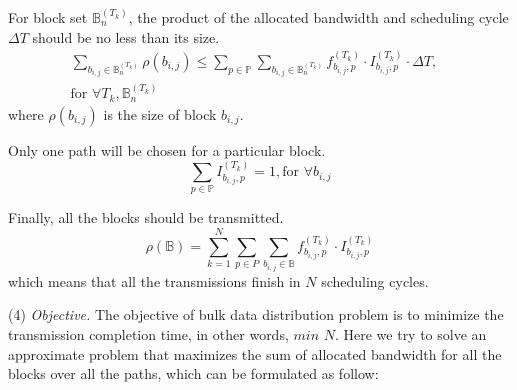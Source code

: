 \begin{packeditemize}
\item For block set $\mathbb{B}^{(T_k)}_n$, the product of the allocated bandwidth and scheduling cycle $\Delta T$ should be no less than its size.%
\begin{equation}
\begin{split}
\displaystyle{\sum_{b_{i,j}\in \mathbb{B}^{(T_k)}_n}} \rho(b_{i,j}) \leq \displaystyle{\sum_{p\in \mathbb{P}}} \displaystyle{\sum_{b_{i,j} \in \mathbb{B}^{(T_k)}_n}} f^{(T_k)}_{b_{i,j},p} \cdot I^{(T_k)}_{b_{i,j},p} \cdot \Delta T,& \\
\text{for }\forall T_k, \mathbb{B}^{(T_k)}_n &
\end{split}
\end{equation}
where $\rho(b_{i,j})$ is the size of block $b_{i,j}$.


\item Only one path will be chosen for a particular block.
\begin{equation}
\displaystyle{\sum_{p \in \mathbb{P}}} I^{(T_k)}_{b_{i,j},p} = 1, \text{for }\forall b_{i,j}
\end{equation}

\item Finally, all the blocks should be transmitted.
\begin{equation}
\rho (\mathbb{B}) = \displaystyle{\sum_{k=1}^{N}} \displaystyle{\sum_{p\in P}} \displaystyle{\sum_{b_{i,j}\in \mathbb{B}}} f_{b_{i,j},p}^{(T_k)} \cdot I_{b_{i,j},p}^{(T_k)}
\end{equation}
which means that all the transmissions finish in $N$ scheduling cycles.
\end{packeditemize}


\noindent(4) {\em Objective.} The objective of bulk data distribution problem is to minimize the transmission completion time, in other words, $min$ $N$. Here we try to solve an approximate problem that maximizes the sum of allocated bandwidth for all the blocks over all the paths, which can be formulated as follow:

